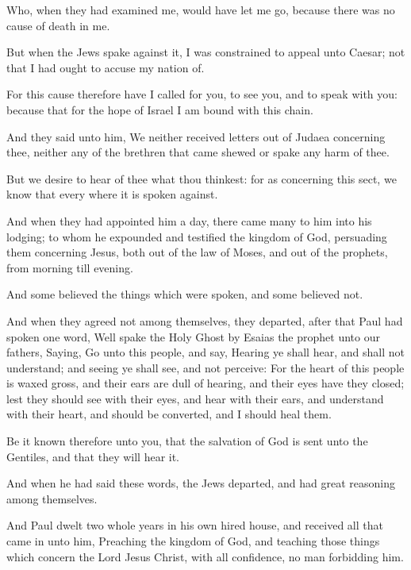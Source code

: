 \Verse Who, when they had examined me, would have let me go, because there was no cause of death in me.

\Verse But when the Jews spake against it, I was constrained to appeal unto Caesar; not that I had ought to accuse my nation of.

\Verse For this cause therefore have I called for you, to see you, and to speak with you: because that for the hope of Israel I am bound with this chain.

\Verse And they said unto him, We neither received letters out of Judaea concerning thee, neither any of the brethren that came shewed or spake any harm of thee.

\Verse But we desire to hear of thee what thou thinkest: for as concerning this sect, we know that every where it is spoken against.

\Verse And when they had appointed him a day, there came many to him into his lodging; to whom he expounded and testified the kingdom of God, persuading them concerning Jesus, both out of the law of Moses, and out of the prophets, from morning till evening.

\Verse And some believed the things which were spoken, and some believed not.

\Verse And when they agreed not among themselves, they departed, after that Paul had spoken one word, Well spake the Holy Ghost by Esaias the prophet unto our fathers, \Verse Saying, Go unto this people, and say, Hearing ye shall hear, and shall not understand; and seeing ye shall see, and not perceive: \Verse For the heart of this people is waxed gross, and their ears are dull of hearing, and their eyes have they closed; lest they should see with their eyes, and hear with their ears, and understand with their heart, and should be converted, and I should heal them.

\Verse Be it known therefore unto you, that the salvation of God is sent unto the Gentiles, and that they will hear it.

\Verse And when he had said these words, the Jews departed, and had great reasoning among themselves.

\Verse And Paul dwelt two whole years in his own hired house, and received all that came in unto him, \Verse Preaching the kingdom of God, and teaching those things which concern the Lord Jesus Christ, with all confidence, no man forbidding him.

